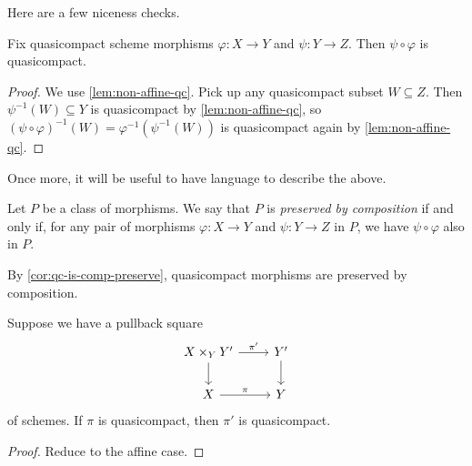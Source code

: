 \documentclass[../notes.tex]{subfiles}
\begin{document}
Here are a few niceness checks.
\begin{corollary} \label{cor:qc-is-comp-preserve}
	Fix quasicompact scheme morphisms $\varphi\colon X\to Y$ and $\psi\colon Y\to Z$. Then $\psi\circ\varphi$ is quasicompact.
\end{corollary}
\begin{proof}
	We use \autoref{lem:non-affine-qc}. Pick up any quasicompact subset $W\subseteq Z$. Then $\psi^{-1}(W)\subseteq Y$ is quasicompact by \autoref{lem:non-affine-qc}, so $(\psi\circ\varphi)^{-1}(W)=\varphi^{-1}(\psi^{-1}(W))$ is quasicompact again by \autoref{lem:non-affine-qc}.
\end{proof}
Once more, it will be useful to have language to describe the above.
\begin{definition}
	Let $P$ be a class of morphisms. We say that $P$ is \textit{preserved by composition} if and only if, for any pair of morphisms $\varphi\colon X\to Y$ and $\psi\colon Y\to Z$ in $P$, we have $\psi\circ\varphi$ also in $P$.
\end{definition}
\begin{example}
	By \autoref{cor:qc-is-comp-preserve}, quasicompact morphisms are preserved by composition.
\end{example}
\begin{corollary}
	Suppose we have a pullback square
	\[\begin{tikzcd}
		{X\times_YY'} & {Y'} \\
		X & Y
		\arrow["\pi", from=2-1, to=2-2]
		\arrow["{\pi'}", from=1-1, to=1-2]
		\arrow[from=1-1, to=2-1]
		\arrow[from=1-2, to=2-2]
	\end{tikzcd}\]
	of schemes. If $\pi$ is quasicompact, then $\pi'$ is quasicompact.
\end{corollary}
\begin{proof}
	Reduce to the affine case.
\end{proof}
\end{document}
